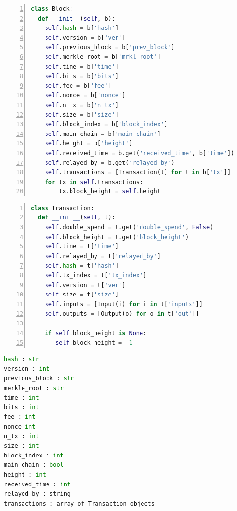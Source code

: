 \documentclass[USenglish]{uit-thesis}
\begin{document}
\begin{appendices}
\begin{lstlisting}[float, numbers=left,frame=single,caption={Block object represented in Python according to api-v1-client-python to retrieve data on the blockchain. The function get\_block() will return an object of this type\,\cite{bitcoin_api}.},language=Python]
class Block:
  def __init__(self, b):
    self.hash = b['hash']
    self.version = b['ver']
    self.previous_block = b['prev_block']
    self.merkle_root = b['mrkl_root']
    self.time = b['time']
    self.bits = b['bits']
    self.fee = b['fee']
    self.nonce = b['nonce']
    self.n_tx = b['n_tx']
    self.size = b['size']
    self.block_index = b['block_index']
    self.main_chain = b['main_chain']
    self.height = b['height']
    self.received_time = b.get('received_time', b['time'])
    self.relayed_by = b.get('relayed_by')
    self.transactions = [Transaction(t) for t in b['tx']]
    for tx in self.transactions:
        tx.block_height = self.height
\end{lstlisting}


\begin{lstlisting}[float, numbers=left,frame=single,caption={Transaction object represented in Python according to api-v1-client-python to retrieve data on the blockchain. The function get\_transaction() will return an object of this type\,\cite{bitcoin_api}.},language=Python]
class Transaction:
  def __init__(self, t):
    self.double_spend = t.get('double_spend', False)
    self.block_height = t.get('block_height')
    self.time = t['time']
    self.relayed_by = t['relayed_by']
    self.hash = t['hash']
    self.tx_index = t['tx_index']
    self.version = t['ver']
    self.size = t['size']
    self.inputs = [Input(i) for i in t['inputs']]
    self.outputs = [Output(o) for o in t['out']]

    if self.block_height is None:
       self.block_height = -1
\end{lstlisting}


\begin{lstlisting}[float, frame=single, caption={Json object returned from the method \emph{get\_block()} in the Bitcoin \gls{api} class blockexplorer.py\,\cite{bitcoin_api}}, language=Python]
hash : str
version : int
previous_block : str
merkle_root : str
time : int
bits : int
fee : int
nonce int
n_tx : int
size : int
block_index : int
main_chain : bool
height : int
received_time : int
relayed_by : string
transactions : array of Transaction objects
\end{lstlisting}



\end{appendices}
\end{document}
